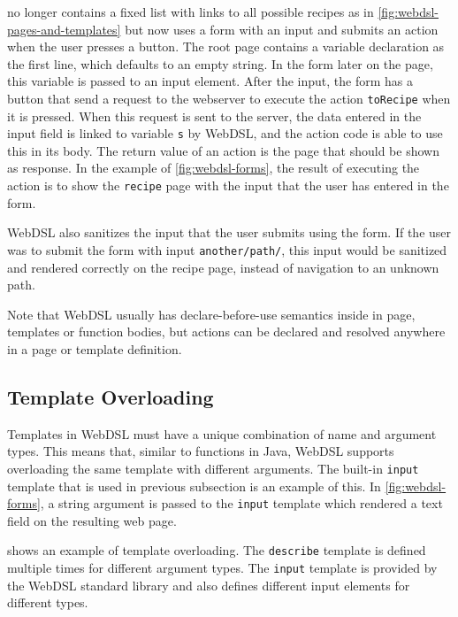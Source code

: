        no longer contains a fixed list with links to all possible recipes as in \cref{fig:webdsl-pages-and-templates} but now uses a form with an input and submits an action when the user presses a button. The root page contains a variable declaration as the first line, which defaults to an empty string. In the form later on the page, this variable is passed to an input element. After the input, the form has a button that send a request to the webserver to execute the action \texttt{toRecipe} when it is pressed. When this request is sent to the server, the data entered in the input field is linked to variable \texttt{s} by WebDSL, and the action code is able to use this in its body. The return value of an action is the page that should be shown as response. In the example of \cref{fig:webdsl-forms}, the result of executing the action is to show the \texttt{recipe} page with the input that the user has entered in the form.

      WebDSL also sanitizes the input that the user submits using the form. If the user was to submit the form with input \texttt{another/path/}, this input would be sanitized and rendered correctly on the recipe page, instead of navigation to an unknown path.

      Note that WebDSL usually has declare-before-use semantics inside in page, templates or function bodies, but actions can be declared and resolved anywhere in a page or template definition.

    \subsection{\label{subsec:template-overloading}Template Overloading}

      Templates in WebDSL must have a unique combination of name and argument types. This means that, similar to functions in Java, WebDSL supports overloading the same template with different arguments. The built-in \texttt{input} template that is used in previous subsection is an example of this. In \cref{fig:webdsl-forms}, a string argument is passed to the \texttt{input} template which rendered a text field on the resulting web page.

       shows an example of template overloading. The \texttt{describe} template is defined multiple times for different argument types. The \texttt{input} template is provided by the WebDSL standard library and also defines different input elements for different types.

